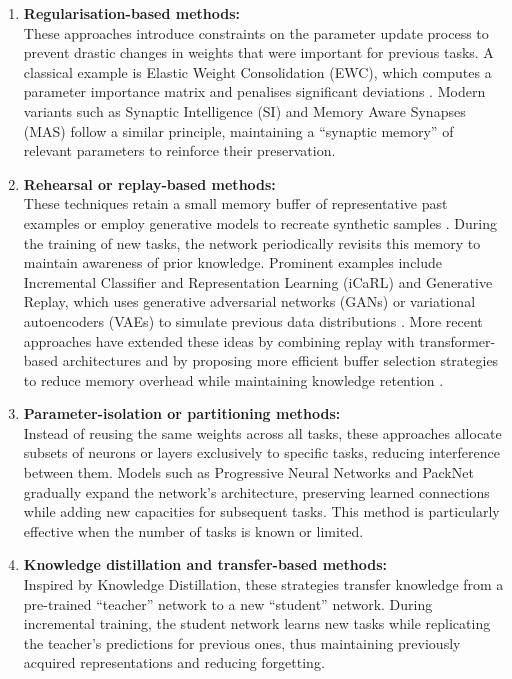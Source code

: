 \begin{enumerate}
    \item \textbf{Regularisation-based methods:} \\
    These approaches introduce constraints on the parameter update process to prevent drastic changes in weights that were important for previous tasks.  
    A classical example is Elastic Weight Consolidation (EWC), which computes a parameter importance matrix and penalises significant deviations \cite{kirkpatrick2017overcoming}.  
    Modern variants such as Synaptic Intelligence (SI) and Memory Aware Synapses (MAS) follow a similar principle, maintaining a “synaptic memory” of relevant parameters to reinforce their preservation.

    \item \textbf{Rehearsal or replay-based methods:} \\
    These techniques retain a small memory buffer of representative past examples or 
    employ generative models to recreate synthetic samples \cite{rebuffi2017icarl, 
    rolnick2019experience}. During the training of new tasks, the network periodically 
    revisits this memory to maintain awareness of prior knowledge. Prominent examples 
    include Incremental Classifier and Representation Learning (iCaRL) 
    \cite{rebuffi2017icarl} and Generative Replay, which uses generative adversarial 
    networks (GANs) or variational autoencoders (VAEs) to simulate previous data 
    distributions \cite{shin2017continual}. More recent approaches have extended these 
    ideas by combining replay with transformer-based architectures \cite{wang2024comprehensive} 
    and by proposing more efficient buffer selection strategies to reduce memory overhead 
    while maintaining knowledge retention \cite{sarkar2025adaptive, CERASUOLO2024}.

    \item \textbf{Parameter-isolation or partitioning methods:} \\
    Instead of reusing the same weights across all tasks, these approaches allocate subsets of neurons or layers exclusively to specific tasks, reducing interference between them.  
    Models such as Progressive Neural Networks and PackNet gradually expand the network’s architecture, preserving learned connections while adding new capacities for subsequent tasks.  
    This method is particularly effective when the number of tasks is known or limited.

    \item \textbf{Knowledge distillation and transfer-based methods:} \\
    Inspired by Knowledge Distillation, these strategies transfer knowledge from a pre-trained “teacher” network to a new “student” network.  
    During incremental training, the student network learns new tasks while replicating the teacher’s predictions for previous ones, thus maintaining previously acquired representations and reducing forgetting.


\end{enumerate}
